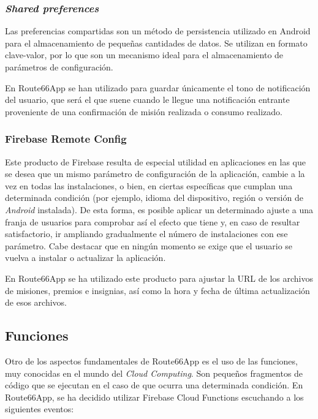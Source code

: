 \documentclass[twoside]{report}
\begin{document}
\subsubsection{\textit{Shared preferences}}

Las preferencias compartidas son un método de persistencia utilizado en Android para el almacenamiento de pequeñas cantidades de datos. Se utilizan en formato clave-valor, por lo que son un mecanismo ideal para el almacenamiento de parámetros de configuración.

En Route66App se han utilizado para guardar únicamente el tono de notificación del usuario, que será el que suene cuando le llegue una notificación entrante proveniente de una confirmación de misión realizada o consumo realizado.

\subsubsection{Firebase Remote Config}

Este producto de Firebase resulta de especial utilidad en aplicaciones en las que se desea que un mismo parámetro de configuración de la aplicación, cambie a la vez en todas las instalaciones, o bien, en ciertas específicas que cumplan una determinada condición (por ejemplo, idioma del dispositivo, región o versión de \textit{Android} instalada). De esta forma, es posible aplicar un determinado ajuste a una franja de usuarios para comprobar así el efecto que tiene y, en caso de resultar satisfactorio, ir ampliando gradualmente el número de instalaciones con ese parámetro. Cabe destacar que en ningún momento se exige que el usuario se vuelva a instalar o actualizar la aplicación.

En Route66App se ha utilizado este producto para ajustar la URL de los archivos de misiones, premios e insignias, así como la hora y fecha de última actualización de esos archivos.

\subsection{Funciones}

Otro de los aspectos fundamentales de Route66App es el uso de las funciones, muy conocidas en el mundo del \textit{Cloud Computing}. Son pequeños fragmentos de código que se ejecutan en el caso de que ocurra una determinada condición. En Route66App, se ha decidido utilizar Firebase Cloud Functions escuchando a los siguientes eventos:
\end{document}
